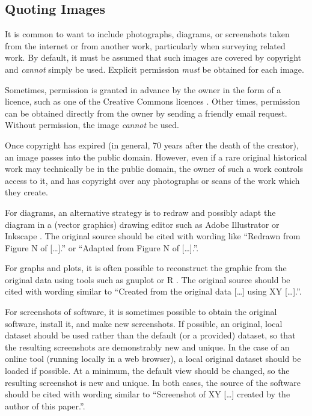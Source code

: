 \subsection{Quoting Images}

It is common to want to include photographs, diagrams, or screenshots
taken from the internet or from another work, particularly when
surveying related work. By default, it must be assumed that such
images are covered by copyright and \emph{cannot} simply be used.
Explicit permission \emph{must} be obtained for each image.

Sometimes, permission is granted in advance by the owner in the form
of a licence, such as one of the Creative Commons licences
\parencite{CC-Licences}. Other times, permission can be obtained
directly from the owner by sending a friendly email request. Without
permission, the image \emph{cannot} be used.

Once copyright has expired (in general, 70 years after the death of
the creator), an image passes into the public domain. However, even if
a rare original historical work may technically be in the public
domain, the owner of such a work controls access to it, and has
copyright over any photographs or scans of the work which they create.


For diagrams, an alternative strategy is to redraw and possibly adapt
the diagram in a (vector graphics) drawing editor such as Adobe
Illustrator \parencite{Adobe-Illustrator} or Inkscape
\parencite{Inkscape}. The original source should be cited with wording
like ``Redrawn from Figure N of [\ldots].'' or ``Adapted from Figure N
of [\ldots].''.

For graphs and plots, it is often possible to reconstruct the graphic
from the original data using tools such as gnuplot \parencite{gnuplot}
or R \parencite{R-Project}. The original source should be cited with
wording similar to ``Created from the original data [\ldots] using XY
[\ldots].''.


For screenshots of software, it is sometimes possible to obtain the
original software, install it, and make new screenshots. If possible,
an original, local dataset should be used rather than the default (or
a provided) dataset, so that the resulting screenshots are
demonstrably new and unique.
%
In the case of an online tool (running locally in a web browser), a
local original dataset should be loaded if possible. At a minimum, the
default view should be changed, so the resulting screenshot is new and
unique.
%
In both cases, the source of the software should be cited with wording
similar to ``Screenshot of XY [\ldots] created by the author of this
paper.''.






